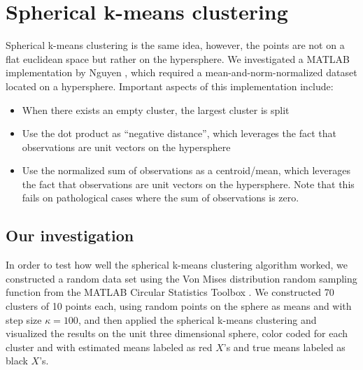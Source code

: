 \documentclass[../tech_report_1.tex]{subfiles}
\begin{document}
\section*{Spherical k-means clustering}

Spherical k-means clustering is the same idea, however, the points are not on a flat euclidean space but rather on the hypersphere.
We investigated a MATLAB implementation by Nguyen \cite{nguyen2008gene,nguyen_spherical_clustering},
which required a mean-and-norm-normalized dataset located on a hypersphere.
Important aspects of this implementation include:
\begin{itemize}
\item When there exists an empty cluster, the largest cluster is split
\item Use the dot product as ``negative distance'', which leverages the
fact that observations are unit vectors on the hypersphere
\item Use the normalized sum of observations as a centroid/mean, which leverages
the fact that observations are unit vectors on the hypersphere. Note
that this fails on pathological cases where the sum of observations
is zero.
\end{itemize}

\subsection*{Our investigation}

In order to test how well the spherical k-means clustering algorithm
worked, we constructed a random data set using the Von Mises distribution
random sampling function from the MATLAB Circular Statistics Toolbox \cite{circstats}.
We constructed 70 clusters of 10 points each, using random points
on the sphere as means and with step size $\kappa=100$, and then applied the spherical k-means clustering and visualized the results on the unit
three dimensional sphere, color coded for each cluster and with estimated
means labeled as red $X$'s and true means labeled as black $X$'s.
\end{document}
